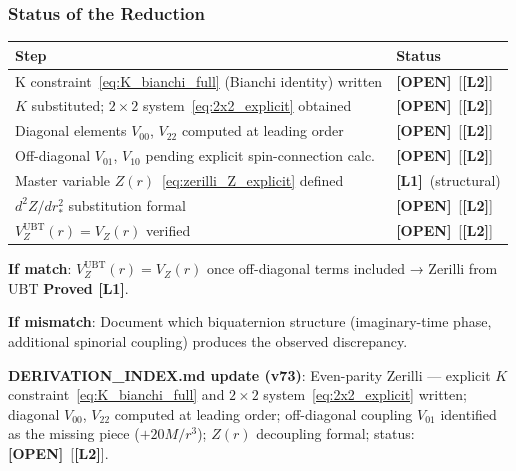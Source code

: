 \documentclass[12pt]{article}
\theoremstyle{definition}
\theoremstyle{remark}
\newcommand{\Lone}{\textbf{[L1]}}
\newcommand{\Ltwo}{\textbf{[L2]}}
\newcommand{\OPEN}{\textbf{[OPEN]}}
\begin{document}
\subsubsection{Status of the Reduction}

\begin{center}
\begin{tabular}{|l|l|}
\hline
\textbf{Step} & \textbf{Status} \\
\hline
K constraint~\eqref{eq:K_bianchi_full} (Bianchi identity) written & \OPEN\ [\Ltwo] \\
$K$ substituted; $2\times 2$ system~\eqref{eq:2x2_explicit} obtained & \OPEN\ [\Ltwo] \\
Diagonal elements $V_{00}$, $V_{22}$ computed at leading order & \OPEN\ [\Ltwo] \\
Off-diagonal $V_{01}$, $V_{10}$ pending explicit spin-connection calc.\ & \OPEN\ [\Ltwo] \\
Master variable $Z(r)$~\eqref{eq:zerilli_Z_explicit} defined & \Lone\ (structural) \\
$d^2Z/dr_*^2$ substitution formal & \OPEN\ [\Ltwo] \\
$V_Z^{\text{UBT}}(r) = V_Z(r)$ verified & \OPEN\ [\Ltwo] \\
\hline
\end{tabular}
\end{center}

\medskip
\noindent\textbf{If match}: $V_Z^{\text{UBT}}(r) = V_Z(r)$ once off-diagonal terms
included → Zerilli from UBT \textbf{Proved [L1]}.

\noindent\textbf{If mismatch}: Document which biquaternion structure (imaginary-time
phase, additional spinorial coupling) produces the observed discrepancy.

\medskip
\noindent\textbf{DERIVATION\_INDEX.md update (v73)}: Even-parity Zerilli —
explicit $K$ constraint~\eqref{eq:K_bianchi_full} and $2\times2$
system~\eqref{eq:2x2_explicit} written; diagonal $V_{00}$, $V_{22}$ computed
at leading order; off-diagonal coupling $V_{01}$ identified as the missing
piece ($+20M/r^3$); $Z(r)$ decoupling formal; status: \OPEN\ [\Ltwo].
\end{document}
